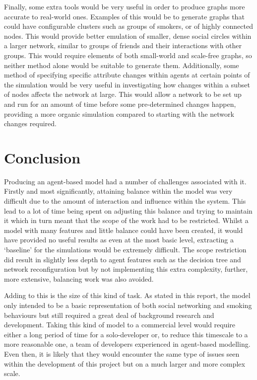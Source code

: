 \documentclass[]{report}
\begin{document}
Finally, some extra tools would be very useful in order to produce graphs more accurate to real-world ones. Examples of this would be to generate graphs that could have configurable clusters such as groups of smokers, or of highly connected nodes. This would provide better emulation of smaller, dense social circles within a larger network, similar to groups of friends and their interactions with other groups. This would require elements of both small-world and scale-free graphs, so neither method alone would be suitable to generate them. Additionally, some method of specifying specific attribute changes within agents at certain points of the simulation would be very useful in investigating how changes within a subset of nodes affects the network at large. This would allow a network to be set up and run for an amount of time before some pre-determined changes happen, providing a more organic simulation compared to starting with the network changes required.


%
%

%
%
\chapter{Conclusion}

Producing an agent-based model had a number of challenges associated with it. Firstly and most significantly, attaining balance within the model was very difficult due to the amount of interaction and influence within the system. This lead to a lot of time being spent on adjusting this balance and trying to maintain it which in turn meant that the scope of the work had to be restricted. Whilst a model with many features and little balance could have been created, it would have provided no useful results as even at the most basic level, extracting a ‘baseline’ for the simulations would be extremely difficult. The scope restriction did result in slightly less depth to agent features such as the decision tree and network reconfiguration but by not implementing this extra complexity, further, more extensive, balancing work was also avoided.

Adding to this is the size of this kind of task. As stated in this report, the model only intended to be a basic representation of both social networking and smoking behaviours but still required a great deal of background research and development. Taking this kind of model to a commercial level would require either a long period of time for a solo-developer or, to reduce this timescale to a more reasonable one, a team of developers experienced in agent-based modelling. Even then, it is likely that they would encounter the same type of issues seen within the development of this project but on a much larger and more complex scale.
\end{document}
